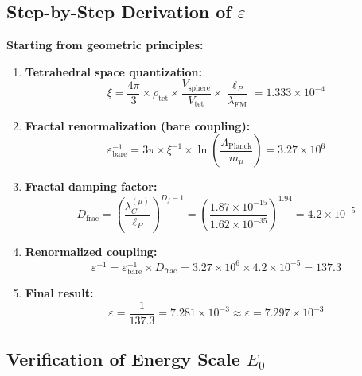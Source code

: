 \documentclass[12pt,a4paper]{article}
\numberwithin{equation}{section}
\newcommand{\xipar}{\xi}
\newcommand{\epsilonT}{\varepsilon}
\newcommand{\Df}{D_f}
\newcommand{\Eo}{E_0}
\newcommand{\lP}{\ell_P}
\newcommand{\lambdaC}{\lambda_C}
\newcommand{\lambdaEM}{\lambda_{\text{EM}}}
\begin{document}
	\subsection{Step-by-Step Derivation of $\epsilonT$}
	
	\textbf{Starting from geometric principles:}
	
	\begin{enumerate}
		\item \textbf{Tetrahedral space quantization:}
		\begin{equation}
			\xipar = \frac{4\pi}{3} \times \rho_{\text{tet}} \times \frac{V_{\text{sphere}}}{V_{\text{tet}}} \times \frac{\lP}{\lambdaEM} = 1.333 \times 10^{-4}
			\label{eq:xi_step1}
		\end{equation}
		
		\item \textbf{Fractal renormalization (bare coupling):}
		\begin{equation}
			\epsilonT^{-1}_{\text{bare}} = 3\pi \times \xipar^{-1} \times \ln\left(\frac{\Lambda_{\text{Planck}}}{m_\mu}\right) = 3.27 \times 10^6
			\label{eq:epsilon_step2}
		\end{equation}
		
		\item \textbf{Fractal damping factor:}
		\begin{equation}
			D_{\text{frac}} = \left(\frac{\lambdaC^{(\mu)}}{\lP}\right)^{\Df-1} = \left(\frac{1.87 \times 10^{-15}}{1.62 \times 10^{-35}}\right)^{1.94} = 4.2 \times 10^{-5}
			\label{eq:epsilon_step3}
		\end{equation}
		
		\item \textbf{Renormalized coupling:}
		\begin{equation}
			\epsilonT^{-1} = \epsilonT^{-1}_{\text{bare}} \times D_{\text{frac}} = 3.27 \times 10^6 \times 4.2 \times 10^{-5} = 137.3
			\label{eq:epsilon_step4}
		\end{equation}
		
		\item \textbf{Final result:}
		\begin{equation}
			\epsilonT = \frac{1}{137.3} = 7.281 \times 10^{-3} \approx  \epsilonT = 7.297 \times 10^{-3}
			\label{eq:epsilon_step5}
		\end{equation}
	\end{enumerate}
	
	\subsection{Verification of Energy Scale $\Eo$}
	
\end{document}
